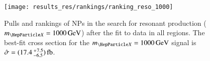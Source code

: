 \begin{figure}[htbp]
  \centering

  \texttt{[image: results\_res/rankings/ranking\_reso\_1000]}

  \caption{Pulls and rankings of NPs in the search for resonant \HH production
    ($\mX = \SI{1000}{\GeV}$) after the fit to data in all regions. The best-fit
    cross section for the $\mX = \SI{1000}{\GeV}$ signal is
    $\hat{\sigma} =
    (\num{17.4}\valuesep^{\hspace{0.25pt}+\hspace{0.25pt}7.5}_{-6.5})\valuesep\si{\femto\barn}$.}%
  \label{fig:ranking_pulls_mx1000}
\end{figure}


